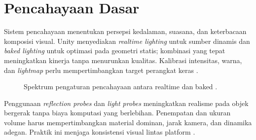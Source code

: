 \documentclass[../main.tex]{subfiles}
\begin{document}
\section{Pencahayaan Dasar}
Sistem pencahayaan menentukan persepsi kedalaman, suasana, dan keterbacaan komposisi visual. Unity menyediakan \textit{realtime lighting} untuk sumber dinamis dan \textit{baked lighting} untuk optimasi pada geometri statis; kombinasi yang tepat meningkatkan kinerja tanpa menurunkan kualitas. Kalibrasi intensitas, warna, dan \textit{lightmap} perlu mempertimbangkan target perangkat keras \parencite{unity-lighting}.

\begin{figure}[h]
  \centering
  \caption{Spektrum pengaturan pencahayaan antara realtime dan baked \parencite{unity-lighting}.}
\end{figure}

Penggunaan \textit{reflection probes} dan \textit{light probes} meningkatkan realisme pada objek bergerak tanpa biaya komputasi yang berlebihan. Penempatan dan ukuran volume harus mempertimbangkan material dominan, jarak kamera, dan dinamika adegan. Praktik ini menjaga konsistensi visual lintas platform \parencite{unity-lighting}.

\onlyinsubfile{\printbibliography}
\end{document}
